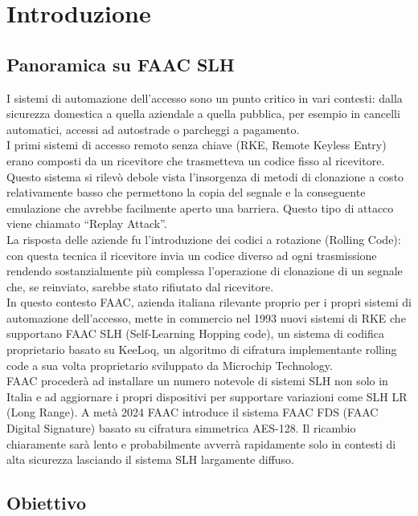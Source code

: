 \chapter{Introduzione}
\label{cha:intro}

\section{Panoramica su FAAC SLH}
\label{sec:overview}

I sistemi di automazione dell’accesso sono un punto critico in vari contesti: dalla sicurezza domestica a quella aziendale a quella pubblica, per esempio in cancelli automatici, accessi ad autostrade o parcheggi a pagamento.\\
I primi sistemi di accesso remoto senza chiave (RKE, Remote Keyless Entry) erano composti da un ricevitore che trasmetteva un codice fisso al ricevitore. Questo sistema si rilevò debole vista l’insorgenza di metodi di clonazione a costo relativamente basso che permettono la copia del segnale e la conseguente emulazione che avrebbe facilmente aperto una barriera. Questo tipo di attacco viene chiamato “Replay Attack”.\\
La risposta delle aziende fu l’introduzione dei codici a rotazione (Rolling Code): con questa tecnica il ricevitore invia un codice diverso ad ogni trasmissione rendendo sostanzialmente più complessa l’operazione di clonazione di un segnale che, se reinviato, sarebbe stato rifiutato dal ricevitore.\\
In questo contesto FAAC, azienda italiana rilevante proprio per i propri sistemi di automazione dell’accesso, mette in commercio nel 1993 nuovi sistemi di RKE che supportano FAAC SLH (Self-Learning Hopping code), un sistema di codifica proprietario basato su KeeLoq, un algoritmo di cifratura implementante rolling code a sua volta proprietario sviluppato da Microchip Technology.\\
FAAC procederà ad installare un numero notevole di sistemi SLH non solo in Italia e ad aggiornare i propri dispositivi per supportare variazioni come SLH LR (Long Range). A metà 2024 FAAC introduce il sistema FAAC FDS (FAAC Digital Signature) basato su cifratura simmetrica AES-128. Il ricambio chiaramente sarà lento e probabilmente avverrà rapidamente solo in contesti di alta sicurezza lasciando il sistema SLH largamente diffuso.\\

\section{Obiettivo}
\label{sec:obj}

